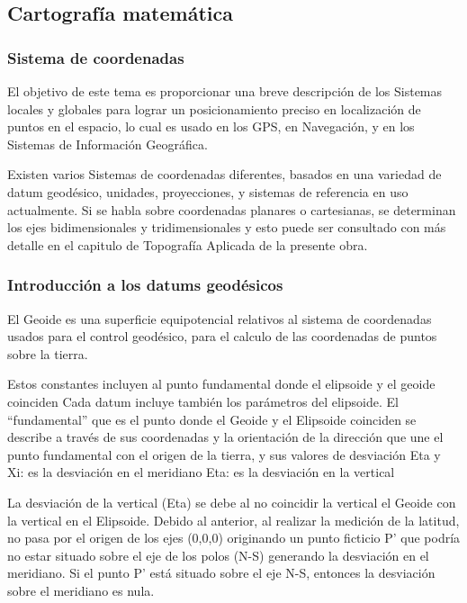 \subsection{Cartografía matemática}

\subsubsection{Sistema de coordenadas}

El objetivo de este tema es proporcionar una breve descripción de los Sistemas locales y globales para lograr un posicionamiento preciso en localización de puntos en el espacio, lo cual es usado en los GPS, en Navegación, y en los Sistemas de Información Geográfica.

Existen varios Sistemas de coordenadas diferentes, basados en una variedad de datum geodésico, unidades, proyecciones, y sistemas de referencia en uso actualmente.
Si se habla sobre coordenadas planares o cartesianas, se determinan los ejes bidimensionales y tridimensionales y esto puede ser consultado con más detalle en el capitulo de Topografía Aplicada de la presente obra.

\subsubsection{Introducción a los datums geodésicos}

El Geoide es una superficie equipotencial relativos al sistema de coordenadas usados para el control geodésico, para el calculo de las coordenadas de puntos sobre la tierra.

Estos constantes incluyen al punto fundamental donde el elipsoide y el geoide coinciden
Cada datum incluye también los parámetros del elipsoide.
El ``fundamental'' que es el punto donde el Geoide y el Elipsoide coinciden se describe a través de sus coordenadas y la orientación de la dirección que une el punto fundamental con el origen de la tierra, y sus valores de desviación Eta y Xi: es la desviación en el meridiano
Eta: es la desviación en la vertical

La desviación de la vertical (Eta) se debe al no coincidir la vertical el Geoide con la vertical en el Elipsoide. Debido al anterior, al realizar la medición de la latitud, no pasa por el origen de los ejes (0,0,0) originando un punto ficticio P' que podría no estar situado sobre el eje de los polos (N-S) generando la desviación en el meridiano. Si el punto P' está situado sobre el eje N-S, entonces la desviación sobre el meridiano es nula.

